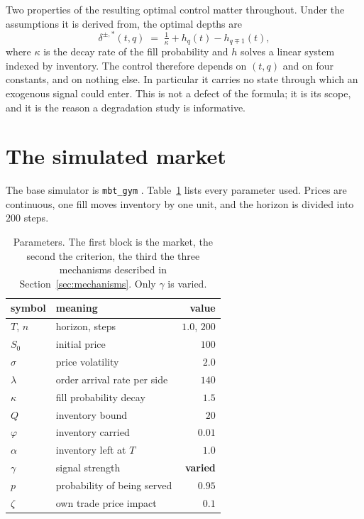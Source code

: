 \documentclass[10pt,twocolumn]{article}
\begin{document}
Two properties of the resulting optimal control matter throughout. Under the assumptions it is derived from, the
optimal depths are
\begin{equation}
\delta^{\pm,*}(t,q) \;=\; \tfrac{1}{\kappa} + h_q(t) - h_{q \mp 1}(t),
\label{eq:cj}
\end{equation}
where $\kappa$ is the decay rate of the fill probability and $h$ solves a linear system indexed by inventory.
The control therefore depends on $(t, q)$ and on four constants, and on nothing else. In particular it carries no
state through which an exogenous signal could enter. This is not a defect of the formula; it is its scope, and it
is the reason a degradation study is informative.

\section{The simulated market}

The base simulator is \texttt{mbt\_gym} \citep{jerome2022mbtgym}. Table~\ref{tab:params} lists every parameter
used. Prices are continuous, one fill moves inventory by one unit, and the horizon is divided into $200$ steps.

\begin{table}[t]
\small\centering
\caption{Parameters. The first block is the market, the second the criterion, the third the three mechanisms
described in Section~\ref{sec:mechanisms}. Only $\gamma$ is varied.}
\label{tab:params}
\begin{tabular}{llr}
\toprule
symbol & meaning & value \\
\midrule
$T$, $n$ & horizon, steps & $1.0$, $200$ \\
$S_0$ & initial price & $100$ \\
$\sigma$ & price volatility & $2.0$ \\
$\lambda$ & order arrival rate per side & $140$ \\
$\kappa$ & fill probability decay & $1.5$ \\
$Q$ & inventory bound & $20$ \\
\midrule
$\varphi$ & inventory carried & $0.01$ \\
$\alpha$ & inventory left at $T$ & $1.0$ \\
\midrule
$\gamma$ & signal strength & \textbf{varied} \\
$p$ & probability of being served & $0.95$ \\
$\zeta$ & own trade price impact & $0.1$ \\
\bottomrule
\end{tabular}
\end{table}
\end{document}
